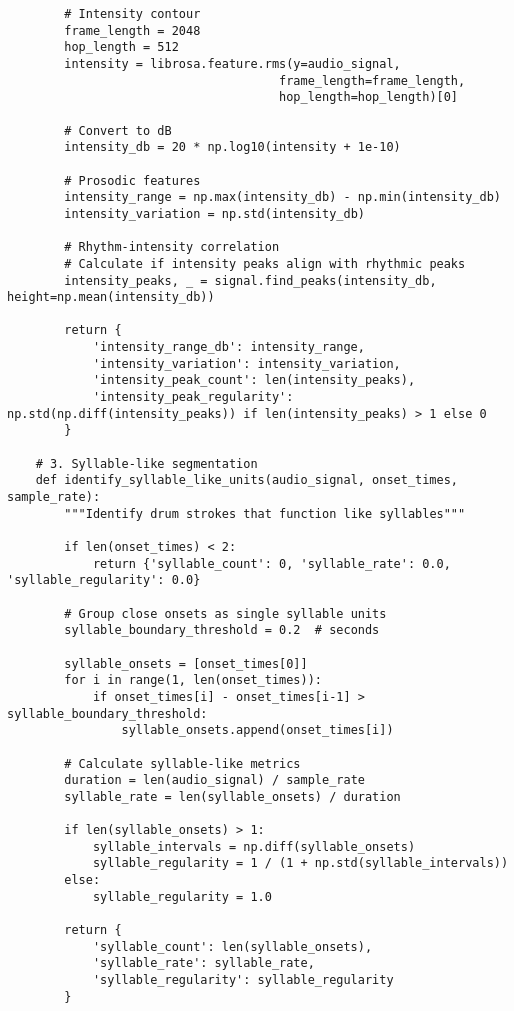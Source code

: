 \documentclass[12pt]{article}
\begin{document}
\begin{verbatim}
        # Intensity contour
        frame_length = 2048
        hop_length = 512
        intensity = librosa.feature.rms(y=audio_signal, 
                                      frame_length=frame_length, 
                                      hop_length=hop_length)[0]
        
        # Convert to dB
        intensity_db = 20 * np.log10(intensity + 1e-10)
        
        # Prosodic features
        intensity_range = np.max(intensity_db) - np.min(intensity_db)
        intensity_variation = np.std(intensity_db)
        
        # Rhythm-intensity correlation
        # Calculate if intensity peaks align with rhythmic peaks
        intensity_peaks, _ = signal.find_peaks(intensity_db, height=np.mean(intensity_db))
        
        return {
            'intensity_range_db': intensity_range,
            'intensity_variation': intensity_variation,
            'intensity_peak_count': len(intensity_peaks),
            'intensity_peak_regularity': np.std(np.diff(intensity_peaks)) if len(intensity_peaks) > 1 else 0
        }
    
    # 3. Syllable-like segmentation
    def identify_syllable_like_units(audio_signal, onset_times, sample_rate):
        """Identify drum strokes that function like syllables"""
        
        if len(onset_times) < 2:
            return {'syllable_count': 0, 'syllable_rate': 0.0, 'syllable_regularity': 0.0}
        
        # Group close onsets as single syllable units
        syllable_boundary_threshold = 0.2  # seconds
        
        syllable_onsets = [onset_times[0]]
        for i in range(1, len(onset_times)):
            if onset_times[i] - onset_times[i-1] > syllable_boundary_threshold:
                syllable_onsets.append(onset_times[i])
        
        # Calculate syllable-like metrics
        duration = len(audio_signal) / sample_rate
        syllable_rate = len(syllable_onsets) / duration
        
        if len(syllable_onsets) > 1:
            syllable_intervals = np.diff(syllable_onsets)
            syllable_regularity = 1 / (1 + np.std(syllable_intervals))
        else:
            syllable_regularity = 1.0
        
        return {
            'syllable_count': len(syllable_onsets),
            'syllable_rate': syllable_rate,
            'syllable_regularity': syllable_regularity
        }
    

\end{verbatim}
\end{document}
